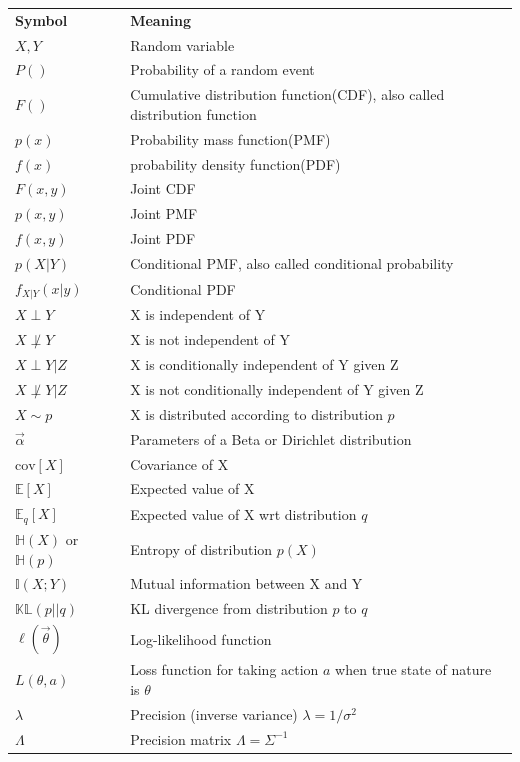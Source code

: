 \documentclass[a4paper,11pt]{article}
\begin{document}
\begin{longtable}{ll}
	\hline\noalign{\smallskip}
	\textbf{Symbol} & \textbf{Meaning} \\
	\noalign{\smallskip}\hline\noalign{\smallskip}
	$X,Y$ & Random variable\\
	$P()$ & Probability of a random event\\
	$F()$ & Cumulative distribution function(CDF), also called distribution function\\
	$p(x)$ & Probability mass function(PMF)\\
	$f(x)$ & probability density function(PDF) \\
	$F(x,y)$ & Joint CDF\\
	$p(x,y)$ & Joint PMF \\
	$f(x,y)$ & Joint PDF\\
	$p(X|Y)$ & Conditional PMF, also called conditional probability\\
	$f_{X|Y}(x|y)$ & Conditional PDF\\
	$X \perp Y$ & X is independent of Y\\
	$X \not\perp Y$ & X is not independent of Y\\
	$X \perp Y | Z $ & X is conditionally independent of Y given Z\\
	$X \not\perp Y | Z $ & X is not conditionally independent of Y given Z\\
	$X \sim p$ & X is distributed according to distribution $p$\\
	$\vec{\alpha}$ & Parameters of a Beta or Dirichlet distribution\\
	$\mathrm{cov}[X]$ & Covariance of X\\
	$\mathbb{E}[X]$ & Expected value of X\\
	$\mathbb{E}_q[X]$ & Expected value of X wrt distribution $q$\\
	$\mathbb{H}(X)$ or $\mathbb{H}(p)$ & Entropy of distribution $p(X)$\\
	$\mathbb{I}(X;Y)$ & Mutual information between X and Y\\
	$\mathbb{KL}(p||q)$ & KL divergence from distribution $p$ to $q$\\
	$\ell(\vec{\theta})$ & Log-likelihood function\\
	$L(\theta,a)$ & Loss function for taking action $a$ when true state of nature is $\theta$\\
	$\lambda$ & Precision (inverse variance) $\lambda=1/\sigma^2$\\
	$\Lambda$ & Precision matrix $\Lambda=\Sigma^{-1}$\\

\end{longtable}
\end{document}
